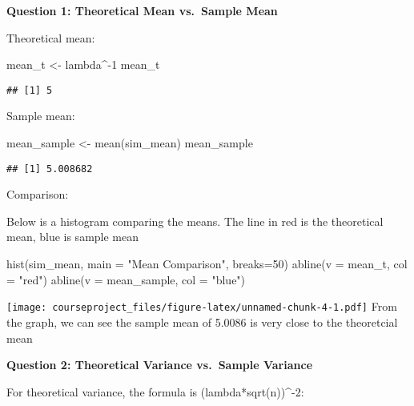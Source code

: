 \documentclass[
]{article}
\newenvironment{Shaded}{\begin{snugshade}}{\end{snugshade}}
\newcommand{\AttributeTok}[1]{\textcolor[rgb]{0.77,0.63,0.00}{#1}}
\newcommand{\DecValTok}[1]{\textcolor[rgb]{0.00,0.00,0.81}{#1}}
\newcommand{\FunctionTok}[1]{\textcolor[rgb]{0.00,0.00,0.00}{#1}}
\newcommand{\NormalTok}[1]{#1}
\newcommand{\OtherTok}[1]{\textcolor[rgb]{0.56,0.35,0.01}{#1}}
\newcommand{\SpecialCharTok}[1]{\textcolor[rgb]{0.00,0.00,0.00}{#1}}
\newcommand{\StringTok}[1]{\textcolor[rgb]{0.31,0.60,0.02}{#1}}
\begin{document}
\textbf{Question 1: Theoretical Mean vs.~Sample Mean}

Theoretical mean:

\begin{Shaded}
\begin{Highlighting}[]
\NormalTok{mean\_t }\OtherTok{\textless{}{-}}\NormalTok{ lambda}\SpecialCharTok{\^{}{-}}\DecValTok{1}
\NormalTok{mean\_t}
\end{Highlighting}
\end{Shaded}

\begin{verbatim}
## [1] 5
\end{verbatim}

Sample mean:

\begin{Shaded}
\begin{Highlighting}[]
\NormalTok{mean\_sample }\OtherTok{\textless{}{-}} \FunctionTok{mean}\NormalTok{(sim\_mean)}
\NormalTok{mean\_sample}
\end{Highlighting}
\end{Shaded}

\begin{verbatim}
## [1] 5.008682
\end{verbatim}

Comparison:

Below is a histogram comparing the means. The line in red is the
theoretical mean, blue is sample mean

\begin{Shaded}
\begin{Highlighting}[]
\FunctionTok{hist}\NormalTok{(sim\_mean, }\AttributeTok{main =} \StringTok{"Mean Comparison"}\NormalTok{, }\AttributeTok{breaks=}\DecValTok{50}\NormalTok{)}
\FunctionTok{abline}\NormalTok{(}\AttributeTok{v =}\NormalTok{ mean\_t, }\AttributeTok{col =} \StringTok{"red"}\NormalTok{)}
\FunctionTok{abline}\NormalTok{(}\AttributeTok{v =}\NormalTok{ mean\_sample, }\AttributeTok{col =} \StringTok{"blue"}\NormalTok{)}
\end{Highlighting}
\end{Shaded}

\texttt{[image: courseproject\_files/figure-latex/unnamed-chunk-4-1.pdf]}
From the graph, we can see the sample mean of 5.0086 is very close to
the theoretcial mean

\textbf{Question 2: Theoretical Variance vs.~Sample Variance}

For theoretical variance, the formula is (lambda*sqrt(n))\^{}-2:
\end{document}
